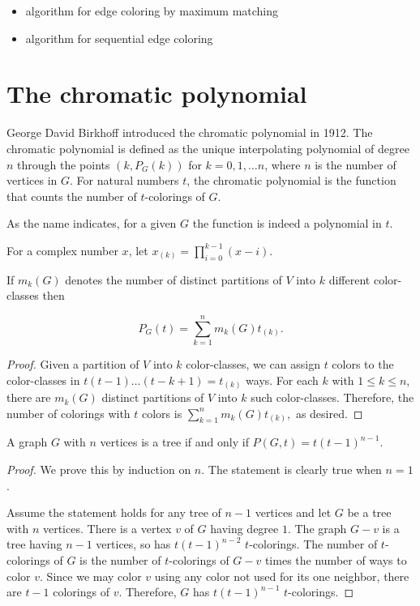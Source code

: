 \begin{itemize}
\item algorithm for edge coloring by maximum matching
\item algorithm for sequential edge coloring
\end{itemize}



\section{The chromatic polynomial}

George David Birkhoff introduced the chromatic polynomial in 1912.
The chromatic polynomial is defined as the unique interpolating
polynomial of degree $n$ through the points $(k,P_G(k))$ for
$k=0,1,\dots n$, where $n$ is the number of vertices in $G$.
For natural numbers $t$, the chromatic polynomial is the function
that counts the
number of $t$-colorings of $G$.

As the name indicates, for a given $G$ the function is indeed a
polynomial in $t$.

For a complex number $x$, let $x_{(k)}=\prod_{i=0}^{k-1} (x-i)$.

\begin{lemma}
If $m_k(G)$ denotes the number of distinct partitions of $V$
into $k$ different color-classes then

\[
P_G(t) = \sum_{k=1}^n m_k(G)t_{(k)}.
\]
\end{lemma}


\begin{proof}
Given a partition of $V$ into $k$ color-classes, we can assign
$t$ colors to the color-classes in $t(t-1)\dots (t-k+1)=t_{(k)}$ ways.
For each $k$ with $1\leq k\leq n$, there are
$m_k(G)$ distinct partitions of $V$ into $k$ such color-classes.
Therefore, the number of colorings with $t$ colors is
$ \sum_{k=1}^n m_k(G)t_{(k)},$ as desired.
\end{proof}



\begin{theorem}
A graph $G$ with $n$ vertices is a tree if and only if $P(G, t) =
t(t-1)^{n-1}$.
\end{theorem}

\begin{proof}
We prove this by induction on $n$. The statement is clearly
true when $n=1$.

Assume the statement holds for any tree of $n-1$ vertices
and let $G$ be a tree with $n$ vertices. There is a vertex $v$
of $G$ having degree $1$. The graph $G-v$ is a tree having $n-1$
vertices, so has $t(t-1)^{n-2}$ $t$-colorings. The number of
$t$-colorings of $G$ is the number of $t$-colorings of $G-v$ times the
number of ways to color $v$. Since we may color $v$ using any
color not used for its one neighbor, there are $t-1$ colorings of $v$.
Therefore, $G$ has $t(t-1)^{n-1}$ $t$-colorings.
\end{proof}

